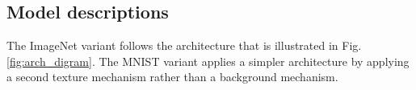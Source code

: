 


\subsection{Model descriptions}

The ImageNet variant follows the architecture that is illustrated in Fig. \ref{fig:arch_digram}. The MNIST variant applies a simpler architecture by applying a second texture mechanism rather than a background mechanism.


